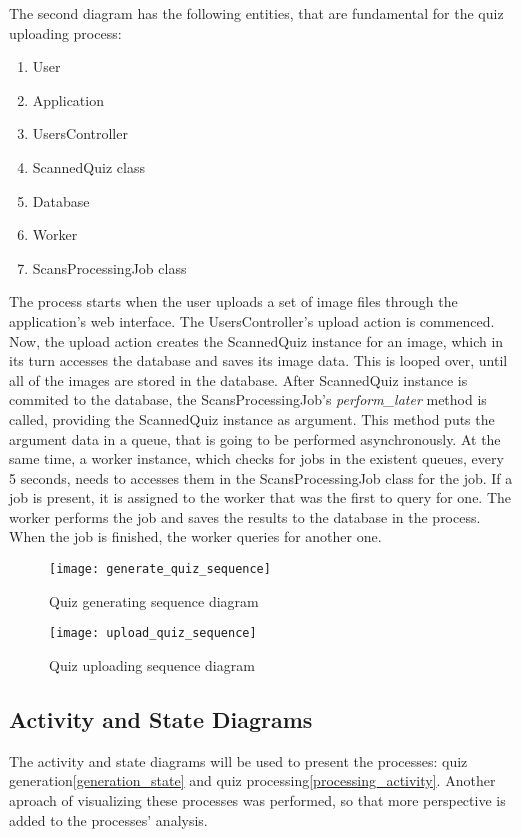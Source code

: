 The second diagram has the following entities, that are fundamental for the quiz uploading process:
\begin{enumerate}
  \item User
  \item Application
  \item UsersController
  \item ScannedQuiz class
  \item Database
  \item Worker
  \item ScansProcessingJob class
\end{enumerate}

The process starts when the user uploads a set of image files through the application's web interface. The UsersController's upload action is commenced. Now, the upload action creates the ScannedQuiz instance for an image, which in its turn accesses the database and saves its image data. This is looped over, until all of the images are stored in the database. After ScannedQuiz instance is commited to the database, the ScansProcessingJob's \textit{perform\_later} method is called, providing the ScannedQuiz instance as argument. This method puts the argument data in a queue, that is going to be performed asynchronously. At the same time, a worker instance, which checks for jobs in the existent queues, every 5 seconds, needs to accesses them in the ScansProcessingJob class for the job. If a job is present, it is assigned to the worker that was the first to query for one. The worker performs the job and saves the results to the database in the process. When the job is finished, the worker queries for another one.

\begin{sidewaysfigure}[!ht]
\centering
\texttt{[image: generate\_quiz\_sequence]}
\caption{Quiz generating sequence diagram}\label{generate_sequence}
\end{sidewaysfigure}

\begin{sidewaysfigure}[!ht]
\centering
\texttt{[image: upload\_quiz\_sequence]}
\caption{Quiz uploading sequence diagram}\label{upload_sequence}
\end{sidewaysfigure}


\subsection{Activity and State Diagrams}
The activity and state diagrams will be used to present the processes: quiz generation\ref{generation_state} and quiz processing\ref{processing_activity}. Another aproach of visualizing these processes was performed, so that more perspective is added to the processes' analysis. 

